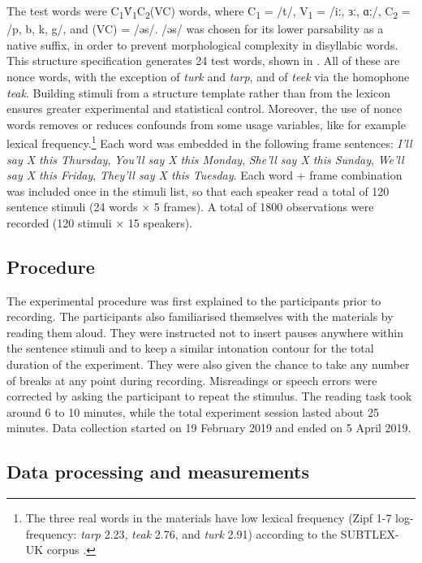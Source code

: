 \documentclass[12pt,a4paper,]{article}
\begin{document}
The test words were
C\textsubscript{1}V́\textsubscript{1}C\textsubscript{2}(VC) words, where
C\textsubscript{1} = /t/, V\textsubscript{1} = /iː, ɜː, ɑː/,
C\textsubscript{2} = /p, b, k, g/, and (VC) = /əs/. /əs/ was chosen for
its lower parsability as a native suffix, in order to prevent
morphological complexity in disyllabic words. This structure
specification generates 24 test words, shown in . All of
these are nonce words, with the exception of \emph{turk} and
\emph{tarp}, and of \emph{teek} via the homophone \emph{teak}. Building
stimuli from a structure template rather than from the lexicon ensures
greater experimental and statistical control. Moreover, the use of nonce
words removes or reduces confounds from some usage variables, like for
example lexical
frequency.\footnote{The three real words in the materials have low lexical frequency (Zipf 1-7 log-frequency: \textit{tarp} 2.23, \textit{teak} 2.76, and \textit{turk} 2.91) according to the SUBTLEX-UK corpus \citep{van-heuven2014}.}
Each word was embedded in the following frame sentences: \emph{I'll say
X this Thursday}, \emph{You'll say X this Monday}, \emph{She'll say X
this Sunday}, \emph{We'll say X this Friday}, \emph{They'll say X this
Tuesday}. Each word + frame combination was included once in the stimuli
list, so that each speaker read a total of 120 sentence stimuli (24
words × 5 frames). A total of 1800 observations were recorded (120
stimuli × 15 speakers).

\hypertarget{procedure}{%
\subsection{Procedure}\label{procedure}}

The experimental procedure was first explained to the participants prior
to recording. The participants also familiarised themselves with the
materials by reading them aloud. They were instructed not to insert
pauses anywhere within the sentence stimuli and to keep a similar
intonation contour for the total duration of the experiment. They were
also given the chance to take any number of breaks at any point during
recording. Misreadings or speech errors were corrected by asking the
participant to repeat the stimulus. The reading task took around 6 to 10
minutes, while the total experiment session lasted about 25 minutes.
Data collection started on 19 February 2019 and ended on 5 April 2019.

\hypertarget{data-processing-and-measurements}{%
\subsection{Data processing and
measurements}\label{data-processing-and-measurements}}
\end{document}

